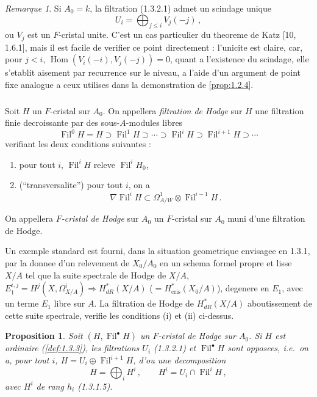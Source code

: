 \documentclass[12pt,a4paper]{article}
\theoremstyle{plain}
\newtheorem{proposition}[theorem]{Proposition}
\theoremstyle{definition}
\theoremstyle{remark}
\newtheorem{remark}[theorem]{Remarque}
\DeclareMathOperator{\Hom}{Hom}
\DeclareMathOperator{\Fil}{Fil}
\newcommand{\crys}{\mathrm{cris}}
\begin{document}
\begin{remark}\label{rem:1.3.4}
Si $A_0 = k$, la filtration (1.3.2.1) admet un scindage unique
\begin{equation}\label{eq:1.3.4.1}
U_i = \bigoplus_{j \leq i} V_j(-j)\,,
\end{equation}
ou $V_j$ est un $F$-cristal unite. C'est un cas particulier du theoreme de Katz [10, 1.6.1], mais il est facile de verifier ce point directement : l'unicite est claire, car, pour $j < i$, $\Hom(V_i(-i), V_j(-j)) = 0$, quant a l'existence du scindage, elle s'etablit aisement par recurrence sur le niveau, a l'aide d'un argument de point fixe analogue a ceux utilises dans la demonstration de \ref{prop:1.2.4}.
\end{remark}

\subsubsection{}

Soit $H$ un $F$-cristal sur $A_0$. On appellera \emph{filtration de Hodge} sur $H$ une filtration finie decroissante par des sous-$A$-modules libres
\[
\Fil^0H = H \supset \Fil^1H \supset \cdots \supset \Fil^iH \supset \Fil^{i+1}H \supset \cdots
\]
verifiant les deux conditions suivantes :
\begin{enumerate}[label=(\roman*)]
\item pour tout $i$, $\Fil^iH$ releve $\Fil^iH_0$,
\item (``transversalite'') pour tout $i$, on a
\begin{equation}\label{eq:1.3.5.1}
\nabla\Fil^iH \subset \Omega^1_{A/W} \otimes \Fil^{i-1}H\,.\end{equation}
\end{enumerate}

On appellera \emph{$F$-cristal de Hodge} sur $A_0$ un $F$-cristal sur $A_0$ muni d'une filtration de Hodge.

Un exemple standard est fourni, dans la situation geometrique envisagee en 1.3.1, par la donnee d'un relevement de $X_0/A_0$ en un schema formel propre et lisse $X/A$ tel que la suite spectrale de Hodge de $X/A$, $E_1^{i,j} = H^j(X, \Omega_{X/A}^i) \Rightarrow H_{dR}^*(X/A)$ ($= H_{\crys}^*(X_0/A)$), degenere en $E_1$, avec un terme $E_1$ libre sur $A$. La filtration de Hodge de $H_{dR}^*(X/A)$ aboutissement de cette suite spectrale, verifie les conditions (i) et (ii) ci-dessus.

\begin{proposition}\label{prop:1.3.6}
Soit $(H, \Fil^\bullet H)$ un $F$-cristal de Hodge sur $A_0$. Si $H$ est ordinaire (\ref{def:1.3.3}), les filtrations $U_i$ (1.3.2.1) et $\Fil^\bullet H$ sont opposees, i.e.\ on a, pour tout $i$, $H = U_i \oplus \Fil^{i+1}H$, d'ou une decomposition
\begin{equation}\label{eq:1.3.6.1}
H = \bigoplus_i H^i\,, \qquad H^i = U_i \cap \Fil^iH\,,
\end{equation}
avec $H^i$ de rang $h_i$ (1.3.1.5).
\end{proposition}
\end{document}
